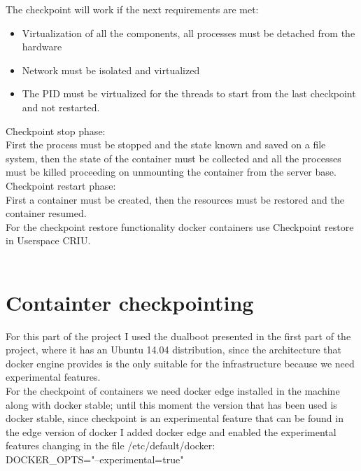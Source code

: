 The checkpoint will work if the next requirements are met:
\begin{itemize}
\item Virtualization of all the components, all processes must be detached from the hardware
\item Network must be isolated and virtualized 
\item The PID must be virtualized for the threads to start from the last checkpoint and not restarted.
\end{itemize}

Checkpoint stop phase:\\
First the process must be stopped and the state known and saved on a file system, then the state of the container must be collected and all the processes must be killed proceeding on unmounting the container from the server base. \\

Checkpoint restart phase:\\
First a container must be created, then the resources must be restored and the container resumed.\cite{11}\\


For the checkpoint restore functionality docker containers use Checkpoint restore in Userspace CRIU.\\


\\
\section{Containter checkpointing}


For this part of the project I used the dualboot presented in the first part of the project, where it has an Ubuntu 14.04 distribution, since the architecture that docker engine provides is the only suitable for the infrastructure because we need experimental features.\\

For the checkpoint of containers we need docker edge\cite{12} installed in the machine along with docker stable; until this moment the version that has been used is docker stable, since checkpoint is an experimental feature that can be found in the edge version of docker I added docker edge and enabled the experimental features changing in the file /etc/default/docker:\\

DOCKER\_OPTS="--experimental=true"\\

